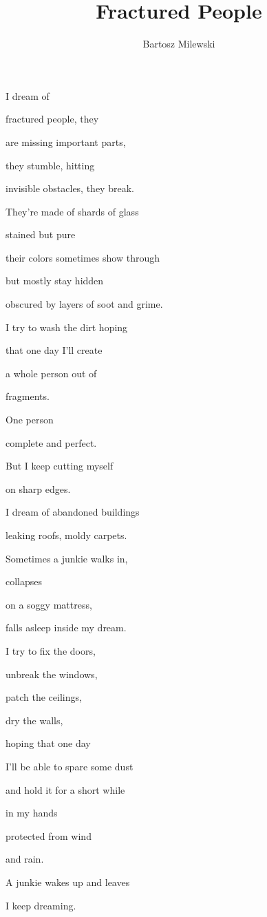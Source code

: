 \documentclass{memoir}
\author{Bartosz Milewski}
\title{Fractured People}
\date{}
\begin{document}
\maketitle{}



I dream of

fractured people, they

are missing important parts,

they stumble, hitting

invisible obstacles, they break.

\bigskip

They're made of shards of glass

stained but pure

their colors sometimes show through

but mostly stay hidden

obscured by layers of soot and grime.

\bigskip

I try to wash the dirt hoping

that one day I'll create

a whole person out of

fragments.

One person

complete and perfect.

But I keep cutting myself

on sharp edges.

\bigskip

I dream of abandoned buildings

leaking roofs, moldy carpets.

Sometimes a junkie walks in,

collapses

on a soggy mattress,

falls asleep inside my dream.

\bigskip

I try to fix the doors,

unbreak the windows,

patch the ceilings,

dry the walls,

hoping that one day 

I'll be able to spare some dust

and hold it for a short while

in my hands

protected from wind 

and rain.

\bigskip

A junkie wakes up and leaves

I keep dreaming.
\end{document}
